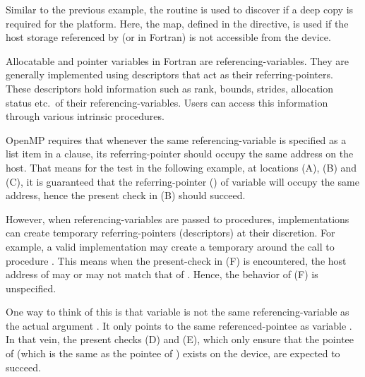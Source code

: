 
Similar to the previous example, the  routine
is used to discover if a deep copy is required for the platform.  Here, the
 map, defined in the  directive, is used
if the host storage referenced by  (or  in Fortran)
is not accessible from the device.


\begin{fortranspecific}
Allocatable and pointer variables in Fortran are referencing-variables.
They are generally 
implemented using descriptors that act as their referring-pointers. 
These descriptors hold information such as rank, bounds, strides, allocation 
status etc.\ of their referencing-variables. Users can access this 
information through various intrinsic procedures.

OpenMP requires that whenever the same referencing-variable is specified 
as a list item in a  clause, its referring-pointer should occupy 
the same address on the host. That means for the test in the following example,
at locations (A), (B) and (C), it is guaranteed that the referring-pointer 
() of variable  will occupy the same address, 
hence the present check in (B) should succeed.

However, when referencing-variables are passed to procedures, implementations 
can create temporary referring-pointers (descriptors) at their discretion. 
For example, a valid implementation may create a temporary  
around the call to procedure . This means when the present-check 
in (F) is encountered, the host address of  may 
or may not match that of . Hence, the behavior 
of (F) is unspecified.

One way to think of this is that variable  is not the same 
referencing-variable as the actual argument . It only points to 
the same referenced-pointee as variable .
In that vein, the present checks (D) and (E), which only ensure that 
the pointee of  (which is the same as the pointee of ) 
exists on the device, are expected to succeed.


\end{fortranspecific}

